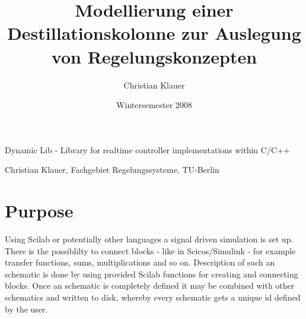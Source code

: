 \documentclass[%
	pdftex,%
	a4paper,%
	oneside,%
	11pt,%
	halfparskip,%
	headsepline,%
	bibtotocnumbered,%
	idxtotoc%
]{scrartcl}
\title{Modellierung einer Destillationskolonne zur Auslegung von Regelungskonzepten}
\author{Christian Klauer}
\date{Wintersemester 2008}
\begin{document}

% 	
% 	
% 	
% 	

\begin{center}
{\huge 
Dynamic Lib - Library for realtime controller implementations within C/C++}

Christian Klauer, Fachgebiet Regelungssysteme, TU-Berlin
\end{center}



\section{Purpose}

Using Scilab or potentially other languages a signal driven simulation is set up. There is the possiblilty to connect blocks - like in Scicos/Simulink - for example transfer functions, sums, multiplications and so on. Description of such an schematic is done by using provided Scilab functions for creating and connecting blocks. Once an schematic is completely defined it may be combined with other schematics and written to disk, whereby every schematic gets a unique id defined by the user.
\end{document}
